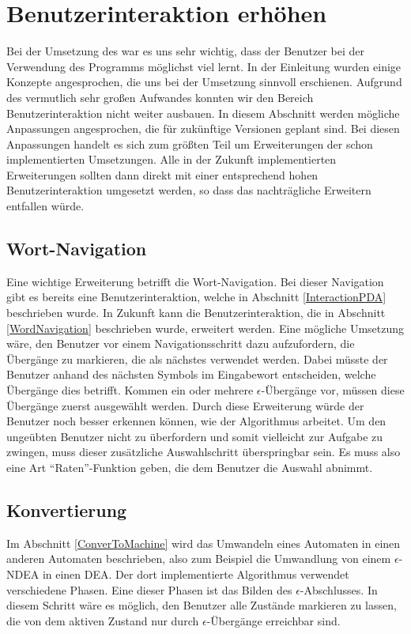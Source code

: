 \section{Benutzerinteraktion erhöhen}\label{PerspectiveInteraction}

Bei der Umsetzung des \gtitools war es uns sehr wichtig, dass der Benutzer bei
der Verwendung des Programms möglichst viel lernt. In der Einleitung wurden
einige Konzepte angesprochen, die uns bei der Umsetzung sinnvoll erschienen.
Aufgrund des vermutlich sehr großen Aufwandes konnten wir den Bereich
Benutzerinteraktion nicht weiter ausbauen. In diesem Abschnitt werden mögliche
Anpassungen angesprochen, die für zukünftige \gtitool Versionen geplant sind. Bei
diesen Anpassungen handelt es sich zum größten Teil um Erweiterungen der schon
implementierten Umsetzungen. Alle in der Zukunft implementierten Erweiterungen
sollten dann direkt mit einer entsprechend hohen Benutzerinteraktion umgesetzt
werden, so dass das nachträgliche Erweitern entfallen würde.\vspace{10pt}


\subsection{Wort-Navigation}\label{PerspectiveWordNavigation}
Eine wichtige Erweiterung betrifft die Wort-Navigation. Bei dieser Navigation
gibt es bereits eine Benutzerinteraktion, welche in Abschnitt
\ref{InteractionPDA} beschrieben wurde. In Zukunft kann die Benutzerinteraktion,
die in Abschnitt \ref{WordNavigation} beschrieben wurde, erweitert werden. Eine
mögliche Umsetzung wäre, den Benutzer vor einem Navigationsschritt dazu
aufzufordern, die Übergänge zu markieren, die als nächstes verwendet werden.
Dabei müsste der Benutzer anhand des nächsten Symbols im Eingabewort entscheiden,
welche Übergänge dies betrifft. Kommen ein oder mehrere $\epsilon$-Übergänge vor,
müssen diese Übergänge zuerst ausgewählt werden. Durch diese Erweiterung würde
der Benutzer noch besser erkennen können, wie der Algorithmus arbeitet. Um den
ungeübten Benutzer nicht zu überfordern und somit vielleicht zur Aufgabe zu
zwingen, muss dieser zusätzliche Auswahlschritt überspringbar sein. Es muss also
eine Art "`Raten"'-Funktion geben, die dem Benutzer die Auswahl
abnimmt.\vspace{10pt}


\subsection{Konvertierung}\label{PerspectiveConvertTo}
Im Abschnitt \ref{ConverToMachine} wird das Umwandeln eines Automaten in einen
anderen Automaten beschrieben, also zum Beispiel die Umwandlung von einem
$\epsilon$-NDEA in einen DEA. Der dort implementierte Algorithmus verwendet
verschiedene Phasen. Eine dieser Phasen ist das Bilden des
$\epsilon$-Abschlusses. In diesem Schritt wäre es möglich, den Benutzer alle
Zustände markieren zu lassen, die von dem aktiven Zustand nur durch
$\epsilon$-Übergänge erreichbar sind.\vspace{10pt}

